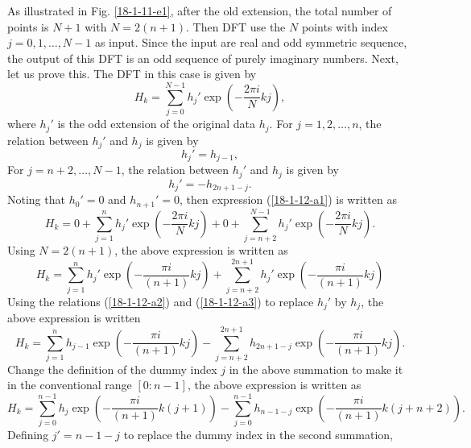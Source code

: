 \documentclass{article}
\begin{document}
As illustrated in Fig. \ref{18-1-11-e1}, after the old extension, the total
number of points is $N + 1$ with $N = 2 (n + 1)$. Then DFT use the $N$ points
with index $j = 0, 1, \ldots, N - 1$ as input. Since the input are real and
odd symmetric sequence, the output of this DFT is an odd sequence of purely
imaginary numbers. Next, let us prove this. The DFT in this case is given by
\begin{equation}
  \label{18-1-12-a1} H_k = \sum_{j = 0}^{N - 1} h_j' \exp \left( - \frac{2 \pi
  i}{N} k j \right),
\end{equation}
where $h_j'$ is the odd extension of the original data $h_j$. For $j = 1, 2,
\ldots, n$, the relation between $h_j'$ and $h_j$ is given by
\begin{equation}
  \label{18-1-12-a2} h_j' = h_{j - 1},
\end{equation}
For $j = n + 2, \ldots, N - 1$, the relation between $h_j'$ and $h_j$ is given
by
\begin{equation}
  \label{18-1-12-a3} h_j' = - h_{2 n + 1 - j} .
\end{equation}
Noting that $h_0' = 0$ and $h_{n + 1}' = 0$, then expression
(\ref{18-1-12-a1}) is written as
\begin{equation}
  H_k = 0 + \sum_{j = 1}^n h_j' \exp \left( - \frac{2 \pi i}{N} k j \right) +
  0 + \sum_{j = n + 2}^{N - 1} h_j' \exp \left( - \frac{2 \pi i}{N} k j
  \right) .
\end{equation}
Using $N = 2 (n + 1)$, the above expression is written as
\begin{equation}
  H_k = \sum_{j = 1}^n h_j' \exp \left( - \frac{\pi i}{(n + 1)} k j \right) +
  \sum_{j = n + 2}^{2 n + 1} h_j' \exp \left( - \frac{\pi i}{(n + 1)} k j
  \right)
\end{equation}
Using the relations (\ref{18-1-12-a2}) and (\ref{18-1-12-a3}) to replace
$h_j'$ by $h_j$, the above expression is written
\begin{equation}
  H_k = \sum_{j = 1}^n h_{j - 1} \exp \left( - \frac{\pi i}{(n + 1)} k j
  \right) - \sum_{j = n + 2}^{2 n + 1} h_{2 n + 1 - j} \exp \left( - \frac{\pi
  i}{(n + 1)} k j \right) .
\end{equation}
Change the definition of the dummy index $j$ in the above summation to make it
in the conventional range $[0 : n - 1]$, the above expression is written as
\[ H_k = \sum_{j = 0}^{n - 1} h_j \exp \left( - \frac{\pi i}{(n + 1)} k (j +
   1) \right) - \sum_{j = 0}^{n - 1} h_{n - 1 - j} \exp \left( - \frac{\pi
   i}{(n + 1)} k (j + n + 2) \right) . \]
Defining $j' = n - 1 - j$ to replace the dummy index in the second summation,
\end{document}
